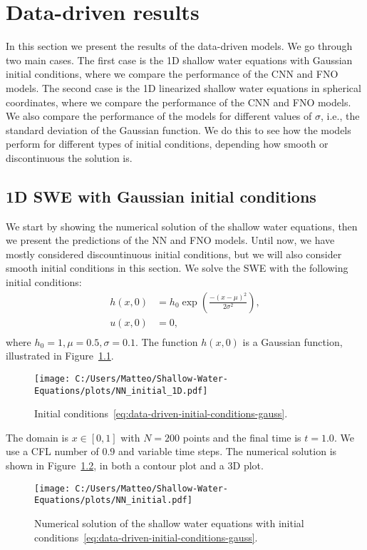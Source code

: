 \chapter{Data-driven results}\label{ch:data-driven-results}
In this section we present the results of the data-driven models.
We go through two main cases. 
The first case is the 1D shallow water equations with Gaussian initial conditions, where we compare the performance of the CNN and FNO models.
The second case is the 1D linearized shallow water equations in spherical coordinates, where we compare the performance of the CNN and FNO models.
We also compare the performance of the models for different values of $\sigma$, i.e., the standard deviation of the Gaussian function.
We do this to see how the models perform for different types of initial conditions, depending how smooth or discontinuous the solution is.

\section{1D SWE with Gaussian initial conditions}
We start by showing the numerical solution of the shallow water equations, then we present the predictions of the NN and FNO models.
Until now, we have mostly considered discountinuous initial conditions, but we will also consider smooth initial conditions in this section.
We solve the SWE with the following initial conditions:
\begin{equation}\label{eq:data-driven-initial-conditions-gauss}
    \begin{aligned}
        h(x, 0) &= h_0 \exp \left( \frac{-{(x-\mu)}^2}{2 \sigma^2} \right) ,\\
        u(x, 0) &= 0 , \\
    \end{aligned}
\end{equation}
where $h_0 = 1, \mu = 0.5, \sigma = 0.1$. 
The function $h(x, 0)$ is a Gaussian function, illustrated in Figure~\ref{fig:NN_initial_1D}.
\begin{figure}[H]
    \centering
    \texttt{[image: C:/Users/Matteo/Shallow-Water-Equations/plots/NN\_initial\_1D.pdf]}
    \caption{Initial conditions~\eqref{eq:data-driven-initial-conditions-gauss}.} \label{fig:NN_initial_1D}
\end{figure}
The domain is $ x \in [0, 1]$ with $N = 200$ points and the final time is $t = 1.0$.
We use a CFL number of $0.9$ and variable time steps.
The numerical solution is shown in Figure~\ref{fig:NN_initial}, in both a contour plot and a 3D plot.
\begin{figure}[H]
    \centering
    \texttt{[image: C:/Users/Matteo/Shallow-Water-Equations/plots/NN\_initial.pdf]}
    \caption{Numerical solution of the shallow water equations with initial conditions~\eqref{eq:data-driven-initial-conditions-gauss}.}\label{fig:NN_initial}
\end{figure}


